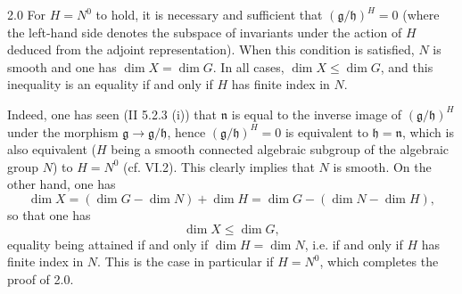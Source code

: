 \begin{lemma}{2.0}\label{XIII.2.0}
For $H=N^0$ to hold, it is necessary and sufficient that
$(\mathfrak g/\mathfrak h)^H=0$ (where the left-hand side denotes the
subspace of invariants under the action of $H$ deduced from the adjoint
representation). When this condition is satisfied, $N$ is smooth and one
has $\dim X=\dim G$. In all cases, $\dim X\leq\dim G$, and this inequality
is an equality if and only if $H$ has finite index in $N$.
\end{lemma}
Indeed, one has seen (II 5.2.3 (i)) that $\mathfrak n$ is equal to the
inverse image of $(\mathfrak g/\mathfrak h)^H$ under the morphism
$\mathfrak g\to\mathfrak g/\mathfrak h$, hence
$(\mathfrak g/\mathfrak h)^H=0$ is equivalent to
$\mathfrak h=\mathfrak n$, which is also equivalent ($H$ being a smooth
connected algebraic subgroup of the algebraic group $N$) to $H=N^0$
(cf. VI.2). This clearly implies that $N$ is smooth. On the other hand,
one has
\[
 \dim X=(\dim G-\dim N)+\dim H=\dim G-(\dim N-\dim H),
\]
so that one has
\[
 \dim X\leq\dim G,
\]
equality being attained if and only if $\dim H=\dim N$, i.e. if and only
if $H$ has finite index in $N$. This is the case in particular if $H=N^0$,
which completes the proof of 2.0.

